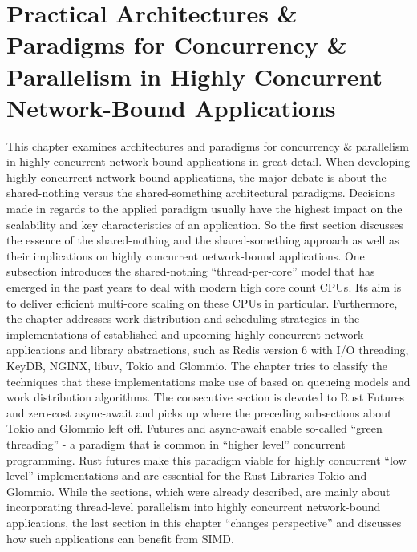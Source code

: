 \chapter{Practical Architectures \& Paradigms for Concurrency \& Parallelism in Highly Concurrent Network-Bound Applications}
This chapter examines architectures and paradigms for concurrency \& parallelism in highly concurrent network-bound applications in great detail. \newline
When developing highly concurrent network-bound applications, the major debate is about the shared-nothing versus the shared-something architectural paradigms. Decisions made in regards to the applied paradigm usually have the highest impact on the scalability and key characteristics of an application. So the first section discusses the essence of the shared-nothing and the shared-something approach as well as their implications on highly concurrent network-bound applications. One subsection introduces the shared-nothing “thread-per-core” model that has emerged in the past years to deal with modern high core count CPUs. Its aim is to deliver efficient multi-core scaling on these CPUs in particular.\newline
Furthermore, the chapter addresses work distribution and scheduling strategies in the implementations of established and upcoming highly concurrent network applications and library abstractions, such as Redis version 6 with I/O threading, KeyDB, NGINX, libuv, Tokio and Glommio. The chapter tries to classify the techniques that these implementations make use of based on queueing models and work distribution algorithms. The consecutive section is devoted to Rust Futures and zero-cost async-await and picks up where the preceding subsections about Tokio and Glommio left off. Futures and async-await enable so-called “green threading” - a paradigm that is common in “higher level” concurrent programming. Rust futures make this paradigm viable for highly concurrent “low level” implementations and are essential for the Rust Libraries Tokio and Glommio. \newline
While the sections, which were already described, are mainly about incorporating thread-level parallelism into highly concurrent network-bound applications, the last section in this chapter “changes perspective” and discusses how such applications can benefit from SIMD. 

